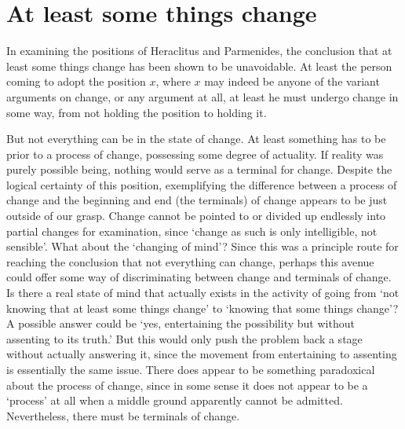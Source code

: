 \section{At least some things change}

In examining the positions of Heraclitus and Parmenides, the conclusion that at least some things change has been shown to be unavoidable. At least the person coming to adopt the position $x$, where $x$ may indeed be anyone of the variant arguments on change, or any argument at all, at least he must undergo change in some way, from not holding the position to holding it.

But not everything can be in the state of change. At least something has to be prior to a process of change, possessing some degree of actuality. If reality was purely possible being, nothing would serve as a terminal for change. Despite the logical certainty of this position, exemplifying the difference between a process of change and the beginning and end (the terminals) of change appears to be just outside of our grasp. Change cannot be pointed to or divided up endlessly into partial changes for examination, since `change as such is only intelligible, not sensible'. \parencite[][48]{de1981christian}
What about the `changing of mind'? Since this was a principle route for reaching the conclusion that not everything can change, perhaps this avenue could offer some way of discriminating between change and terminals of change.
Is there a real state of mind that actually exists in the activity of going from `not knowing that at least some things change' to `knowing that some things change'? A possible answer could be `yes, entertaining the possibility but without assenting to its truth.' But this would only push the problem back a stage without actually answering it, since the movement from entertaining to assenting is essentially the same issue.
There does appear to be something paradoxical about the process of change, since in some sense it does not appear to be a `process' at all when a middle ground apparently cannot be admitted. Nevertheless, there must be terminals of change.

